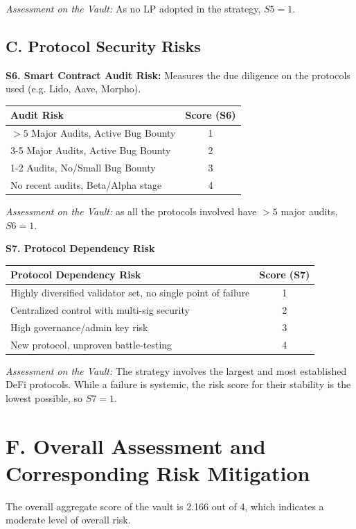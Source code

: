 \documentclass[11pt, a4paper]{article}
\begin{document}
\textit{Assessment on the Vault:} As no LP adopted in the strategy, $S5 = 1$.

\subsection*{C. Protocol Security Risks}

\textbf{S6. Smart Contract Audit Risk:} Measures the due diligence on the protocols used (e.g. Lido, Aave, Morpho).

\begin{tabularx}{0.6\textwidth}{@{} X c @{}}
\toprule
\textbf{Audit Risk} & \textbf{Score (S6)} \\
\midrule
$>5$ Major Audits, Active Bug Bounty & 1 \\
3-5 Major Audits, Active Bug Bounty & 2 \\
1-2 Audits, No/Small Bug Bounty & 3 \\
No recent audits, Beta/Alpha stage & 4 \\
\bottomrule
\end{tabularx}

\textit{Assessment on the Vault:} as all the protocols involved have $>5$ major audits, $S6 = 1$.

\textbf{S7. Protocol Dependency Risk}

\begin{tabularx}{0.8\textwidth}{@{} X c @{}}
\toprule
\textbf{Protocol Dependency Risk} & \textbf{Score (S7)} \\
\midrule
Highly diversified validator set, no single point of failure & 1 \\
Centralized control with multi-sig security & 2 \\
High governance/admin key risk & 3 \\
New protocol, unproven battle-testing & 4 \\
\bottomrule
\end{tabularx}

\textit{Assessment on the Vault:} The strategy involves the largest and most established DeFi protocols. While a failure is systemic, the risk score for their stability is the lowest possible, so $S7 = 1$.

\section*{F. Overall Assessment and Corresponding Risk Mitigation}
The overall aggregate score of the vault is 2.166 out of 4, which indicates a moderate level of overall risk.
\end{document}

